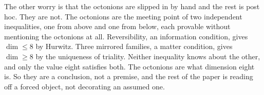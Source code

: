 The other worry is that the octonions are slipped in by hand and the rest is post hoc. They are not. The octonions are
the meeting point of two independent inequalities, one from above and one from below, each provable without mentioning
the octonions at all. Reversibility, an information condition, gives $\dim \le 8$ by Hurwitz. Three mirrored families, a
matter condition, gives $\dim \ge 8$ by the uniqueness of triality. Neither inequality knows about the other, and only
the value eight satisfies both. The octonions are what dimension eight is. So they are a conclusion, not a premise, and
the rest of the paper is reading off a forced object, not decorating an assumed one.
